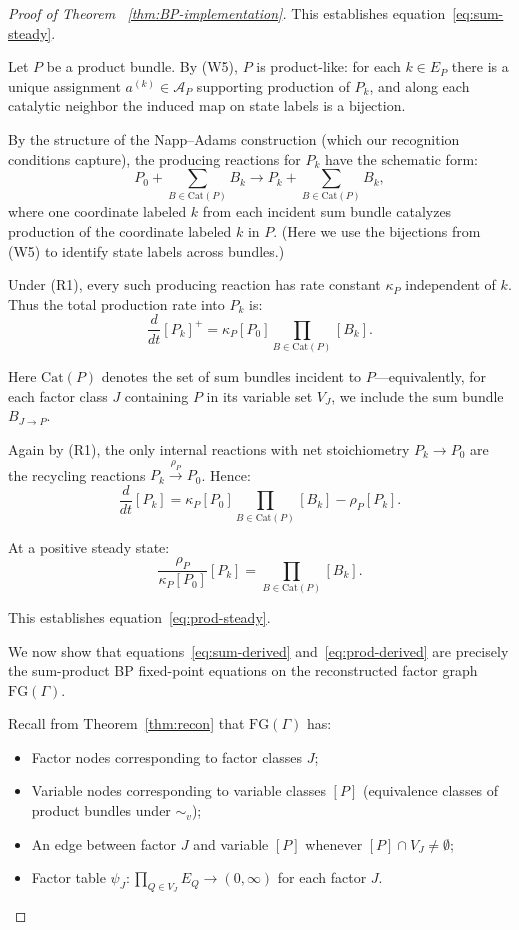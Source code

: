 \documentclass{article}
\theoremstyle{plain}
\theoremstyle{definition}
\theoremstyle{remark}
\newcommand{\Cat}{\textrm{Cat}}
\newcommand{\<}{\langle}
\renewcommand{\>}{\rangle}
\begin{document}
\begin{proof}[Proof of Theorem ~\ref{thm:BP-implementation}]
This establishes equation~\eqref{eq:sum-steady}.

Let $P$ be a product bundle. By (W5), $P$ is product-like: for each $k \in E_P$ there 
is a unique assignment $a^{(k)} \in \mathcal A_P$ supporting production of $P_k$, and along 
each catalytic neighbor the induced map on state labels is a bijection.

By the structure of the Napp--Adams construction (which our recognition conditions 
capture), the producing reactions for $P_k$ have the schematic form:
\[
P_0 + \sum_{B \in \Cat(P)} B_k \longrightarrow P_k + \sum_{B \in \Cat(P)} B_k,
\]
where one coordinate labeled $k$ from each incident sum bundle catalyzes production 
of the coordinate labeled $k$ in $P$. (Here we use the bijections from (W5) to identify 
state labels across bundles.)

Under (R1), every such producing reaction has rate constant $\kappa_P$ independent of $k$. 
Thus the total production rate into $P_k$ is:
\[
\frac{d}{dt}[P_k]^+ = \kappa_P [P_0] \prod_{B \in \Cat(P)} [B_k].
\]

Here $\Cat(P)$ denotes the set of sum bundles incident to $P$---equivalently, 
for each factor class $J$ containing $P$ in its variable set $V_J$, we include the 
sum bundle $B_{J \to P}$.

Again by (R1), the only internal reactions with net stoichiometry $P_k \to P_0$ are 
the recycling reactions $P_k \xrightarrow{\rho_P} P_0$. Hence:
\[
\frac{d}{dt}[P_k] = \kappa_P [P_0] \prod_{B \in \Cat(P)} [B_k] - \rho_P [P_k].
\]

At a positive steady state:
\begin{equation}\label{eq:prod-derived}
\frac{\rho_P}{\kappa_P [P_0]}[P_k] = \prod_{B \in \Cat(P)} [B_k].
\end{equation}

This establishes equation~\eqref{eq:prod-steady}.

We now show that equations~\eqref{eq:sum-derived} and~\eqref{eq:prod-derived} are 
precisely the sum-product BP fixed-point equations on the reconstructed factor graph 
$\mathrm{FG}(\Gamma)$.

Recall from Theorem~\ref{thm:recon} that $\mathrm{FG}(\Gamma)$ has:
\begin{itemize}
\item Factor nodes corresponding to factor classes $J$;
\item Variable nodes corresponding to variable classes $[P]$ (equivalence classes of 
product bundles under $\sim_v$);
\item An edge between factor $J$ and variable $[P]$ whenever $[P] \cap V_J \neq \emptyset$;
\item Factor table $\psi_J : \prod_{Q \in V_J} E_Q \to (0, \infty)$ for each factor $J$.
\end{itemize}


\end{proof}
\end{document}
